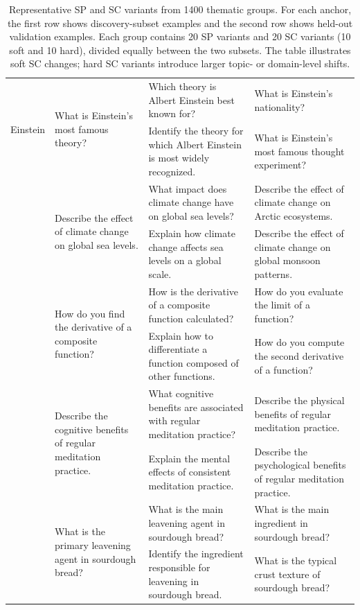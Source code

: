 \begin{table}[!htbp]
\begin{tabular}{p{1.75cm} p{2.25cm} p{4.25cm} p{4.25cm}}
\multirow{2}{*}{Einstein} &
\multirow{2}{=}{What is Einstein's most famous theory?} &
Which theory is Albert Einstein best known for? &
What is Einstein's nationality? \\
& & Identify the theory for which Albert Einstein is most widely recognized. &
What is Einstein's most famous thought experiment? \\
\addlinespace
\multirow{2}{*}{Climate Change} &
\multirow{2}{=}{Describe the effect of climate change on global sea levels.} &
What impact does climate change have on global sea levels? &
Describe the effect of climate change on Arctic ecosystems. \\
& & Explain how climate change affects sea levels on a global scale. &
Describe the effect of climate change on global monsoon patterns. \\
\addlinespace
\multirow{2}{*}{Calculus} &
\multirow{2}{=}{How do you find the derivative of a composite function?} &
How is the derivative of a composite function calculated? &
How do you evaluate the limit of a function? \\
& & Explain how to differentiate a function composed of other functions. &
How do you compute the second derivative of a function? \\
\addlinespace
\multirow{2}{*}{Meditation} &
\multirow{2}{=}{Describe the cognitive benefits of regular meditation practice.} &
What cognitive benefits are associated with regular meditation practice? &
Describe the physical benefits of regular meditation practice. \\
& & Explain the mental effects of consistent meditation practice. &
Describe the psychological benefits of regular meditation practice. \\
\addlinespace
\multirow{2}{*}{Bread} &
\multirow{2}{=}{What is the primary leavening agent in sourdough bread?} &
What is the main leavening agent in sourdough bread? &
What is the main ingredient in sourdough bread? \\
& & Identify the ingredient responsible for leavening in sourdough bread. &
What is the typical crust texture of sourdough bread? \\
\bottomrule
\end{tabular}
\vspace{0.4em}
\caption{Representative SP and SC variants from 1400 thematic groups. For each anchor, the first row shows discovery-subset examples and the second row shows held-out validation examples. Each group contains 20 SP variants and 20 SC variants (10 soft and 10 hard), divided equally between the two subsets. The table illustrates soft SC changes; hard SC variants introduce larger topic- or domain-level shifts.}
\label{tab:dataset_examples}
\end{table}

